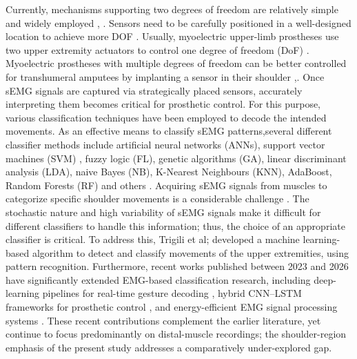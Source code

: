\documentclass{elektr}
\newcommand{\yh}[1]{{\color{revhi}#1}}  %
\begin{document}
Currently, mechanisms supporting two degrees of freedom are relatively simple and widely employed \cite{kaur2016comparison},\cite{chaobankoh2024classification} . Sensors need to be carefully positioned in a well-designed location to achieve more DOF \cite{jarrasse2016classification}. Usually, myoelectric upper-limb prostheses use two upper extremity actuators to control one degree of freedom (DoF)  \cite{thomson2025myoelectric}. Myoelectric prostheses with multiple degrees of freedom can be better controlled for transhumeral amputees by implanting a sensor in their shoulder \cite{chaobankoh2024classification},\cite{jarrasse2016classification}. Once sEMG signals are captured via strategically placed sensors, accurately interpreting them becomes critical for prosthetic control. For this purpose, various classification techniques have been employed to decode the intended movements. As an effective means to classify sEMG patterns\cite{li2017motion,xie2015comparative,thermalBreastXAI},several different classifier methods include artificial neural networks (ANNs), support vector machines (SVM) \cite {singh2020comparative}, fuzzy logic (FL), genetic algorithms (GA), linear discriminant analysis (LDA), naive Bayes (NB), K-Nearest Neighbours (KNN), AdaBoost, Random Forests (RF) and others \cite{seyidbayli2020comparison}. Acquiring sEMG signals from muscles to categorize specific shoulder movements is a considerable challenge \cite{rani2023surface}. The stochastic nature and high variability of sEMG signals make it difficult for different classifiers to handle this information; thus, the choice of an appropriate classifier is critical\cite{zhang2024improving}. To address this, Trigili et al;\cite{trigili2019detection} developed a machine learning-based algorithm to detect and classify movements of the upper extremities, using pattern recognition. Furthermore, \yh{recent works published between 2023 and 2026 have significantly extended EMG-based classification research, including deep-learning pipelines for real-time gesture decoding} \cite{ref2024_en17112539,ref2024_electronics13173552}\yh{, hybrid CNN--LSTM frameworks for prosthetic control} \cite{ref2025_cmes065098}\yh{, and energy-efficient EMG signal processing systems} \cite{ref2024_en17215412}\yh{. These recent contributions complement the earlier literature, yet continue to focus predominantly on distal-muscle recordings; the shoulder-region emphasis of the present study addresses a comparatively under-explored gap.}\\
\end{document}
